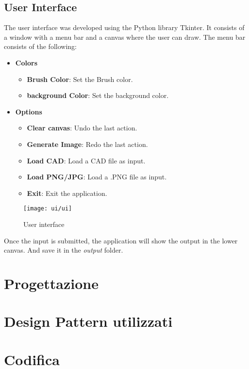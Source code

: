 \subsection{User Interface}
\label{subsec:user-interface}
The user interface was developed using the Python library Tkinter.
It consists of a window with a menu bar and a canvas where the user can draw.
The menu bar consists of the following:
\begin{itemize}
    \item \textbf{Colors}
    \begin{itemize}
        \item \textbf{Brush Color}: Set the Brush color.
        \item \textbf{background Color}: Set the background color.
    \end{itemize}
    \item \textbf{Options}
    \begin{itemize}
        \item \textbf{Clear canvas}: Undo the last action.
        \item \textbf{Generate Image}: Redo the last action.
        \item \textbf{Load CAD}: Load a CAD file as input.
        \item \textbf{Load PNG/JPG}: Load a .PNG file as input.
        \item \textbf{Exit}: Exit the application.
    \end{itemize}
\end{itemize}
\begin{figure}[H]
    \centering
    \texttt{[image: ui/ui]}
    \caption{User interface}
    \label{fig:ui}
\end{figure}
Once the input is submitted, the application will show the output in the lower canvas.
And save it in the \textit{output} folder.
\section{Progettazione}
\label{sec:progettazione}




\section{Design Pattern utilizzati}

\section{Codifica}

